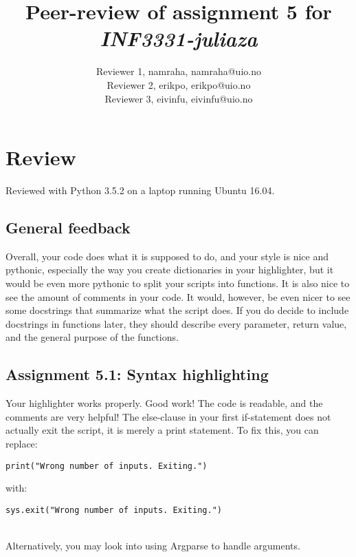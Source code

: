 \documentclass[a4paper]{article}
\title{Peer-review of assignment 5 for \textit{INF3331-juliaza}}
\author{Reviewer 1, namraha, {namraha@uio.no} \\
 		Reviewer 2, erikpo, {erikpo@uio.no} \\
		Reviewer 3, eivinfu, {eivinfu@uio.no}}
\begin{document}
\maketitle

\section{Review}
Reviewed with Python 3.5.2 on a laptop running Ubuntu 16.04.

\subsection*{General feedback}

Overall, your code does what it is supposed to do, and your style is nice and pythonic, especially the way you create dictionaries in your highlighter, but it would be even more pythonic to split your scripts into functions. It is also nice to see the amount of comments in your code. It would, however, be even nicer to see some docstrings that summarize what the script does. If you do decide to include docstrings in functions later, they should describe every parameter, return value, and the general purpose of the functions.


\subsection*{Assignment 5.1: Syntax highlighting}

Your highlighter works properly. Good work! The code is readable, and the comments are very helpful!
The else-clause in your first if-statement does not actually exit the script, it is merely a print statement. To fix this, you can replace:\\
\begin{verbatim}
print("Wrong number of inputs. Exiting.")
\end{verbatim}

with:

\begin{verbatim}
sys.exit("Wrong number of inputs. Exiting.")
\end{verbatim}
\\Alternatively, you may look into using Argparse to handle arguments.
\end{document}
